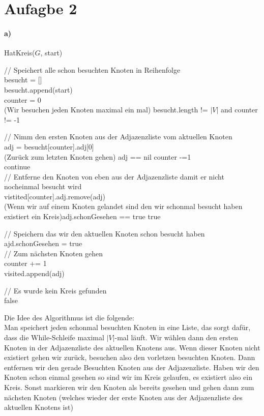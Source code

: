 \documentclass[a4paper]{article}
\begin{document}
\section{Aufagbe 2}

\paragraph{a)}
\noindent HatKreis($G$, start)\\
\begin{algorithm}[H]
    // Speichert alle schon besuchten Knoten in Reihenfolge \\
    besucht = [] \\
    besucht.append(start) \\
    counter = 0 \\
    \While(Wir besuchen jeden Knoten maximal ein mal)
    {besucht.length != $|V|$ and counter != -1}{
        // Nimm den ersten Knoten aus der Adjazenzliste vom 
        aktuellen Knoten \\
        adj = besucht[counter].adj[0] \\
        \If(Zurück zum letzten Knoten gehen)
        {adj == nil}{
            counter -=1 \\
            continue \\
        }
        // Entferne den Knoten von eben aus der Adjazenzliste
        damit er nicht nocheinmal besucht wird \\
        vistited[counter].adj.remove(adj) \\

        \If(Wenn wir auf einem Knoten gelandet sind den 
        wir schonmal besucht haben existiert ein Kreis){adj.schonGesehen == true}{
            \Return true \\
        }

        // Speichern das wir den aktuellen Knoten schon 
        besucht haben \\
        ajd.schonGesehen = true \\

        // Zum nächsten Knoten gehen \\
        counter += 1 \\
        visited.append(adj)

    }
    // Es wurde kein Kreis gefunden \\
    \Return false \\
\end{algorithm}
Die Idee des Algorithmus ist die folgende: \\
Man speichert jeden schonmal besuchten Knoten in eine Liste, das sorgt dafür, dass 
die While-Schleife maximal $|V|$-mal läuft. Wir wählen dann den ersten Knoten in der 
Adjazenzliste des aktuellen Knotens aus. Wenn dieser Knoten nicht existiert gehen wir 
zurück, besuchen also den vorletzen besuchten Knoten. Dann entfernen wir den gerade 
Besuchten Knoten aus der Adjazenzliste. Haben wir den Knoten schon einmal gesehen so sind 
wir im Kreis gelaufen, es existiert also ein Kreis. Sonst markieren wir den 
Knoten als bereits gesehen und gehen dann zum nächsten Knoten (welches wieder 
der erste Knoten aus der Adjazenzliste des aktuellen Knotens ist)
\end{document}
